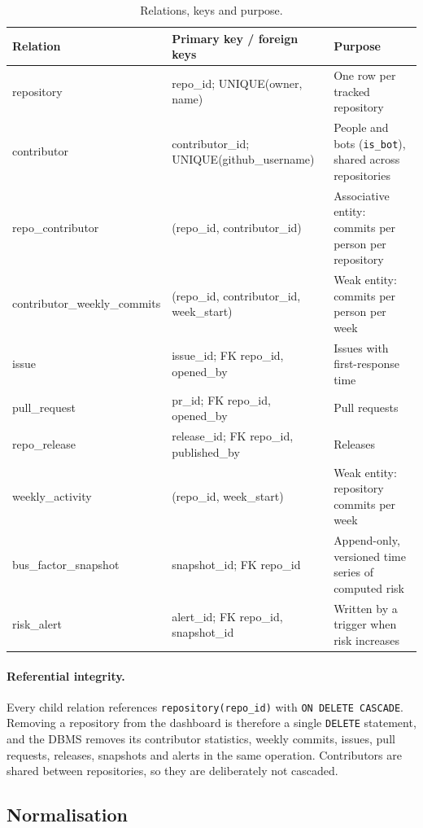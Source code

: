\documentclass[11pt,a4paper]{report}
\begin{document}
\begin{table}[H]
\centering
\caption{Relations, keys and purpose.}
\label{tab:schema}
\small
\begin{tabularx}{\textwidth}{>{\ttfamily}l >{\raggedright\arraybackslash}p{4.6cm} X}
\toprule
\textrm{\textbf{Relation}} & \textbf{Primary key / foreign keys} & \textbf{Purpose} \\
\midrule
repository & repo\_id; UNIQUE(owner, name) & One row per tracked repository \\
contributor & contributor\_id; UNIQUE(github\_username) & People and bots (\texttt{is\_bot}), shared across repositories \\
repo\_contributor & (repo\_id, contributor\_id) & Associative entity: commits per person per repository \\
contributor\_weekly\_commits & (repo\_id, contributor\_id, week\_start) & Weak entity: commits per person per week \\
issue & issue\_id; FK repo\_id, opened\_by & Issues with first-response time \\
pull\_request & pr\_id; FK repo\_id, opened\_by & Pull requests \\
repo\_release & release\_id; FK repo\_id, published\_by & Releases \\
weekly\_activity & (repo\_id, week\_start) & Weak entity: repository commits per week \\
bus\_factor\_snapshot & snapshot\_id; FK repo\_id & Append-only, versioned time series of computed risk \\
risk\_alert & alert\_id; FK repo\_id, snapshot\_id & Written by a trigger when risk increases \\
\bottomrule
\end{tabularx}
\end{table}

\paragraph{Referential integrity.} Every child relation references
\texttt{repository(repo\_id)} with \texttt{ON DELETE CASCADE}. Removing a
repository from the dashboard is therefore a single \texttt{DELETE} statement,
and the DBMS removes its contributor statistics, weekly commits, issues, pull
requests, releases, snapshots and alerts in the same operation. Contributors
are shared between repositories, so they are deliberately not cascaded.

\subsection{Normalisation}
\end{document}
